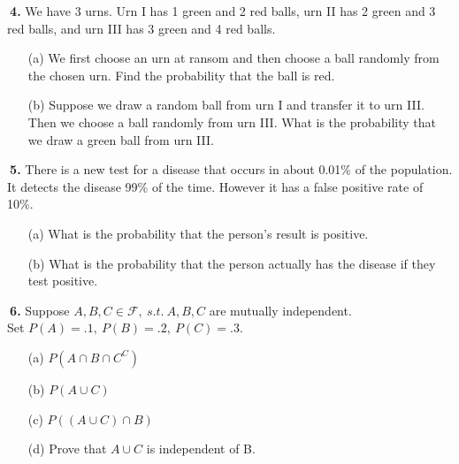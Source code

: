 \documentclass[12pt]{report}
\begin{document}
\noindent {} $~$\textbf{4.} We have 3 urns. Urn I has 1 green and 2 red balls, urn II has 2 green and 3 red balls, and urn III has 3 green and 4 red balls. 
\begin{itemize}
\item [(a)] We first choose an urn at ransom and then choose a ball randomly from the chosen urn. Find the probability that the ball is red. %
\item [(b)] Suppose we draw a random ball from urn I and transfer it to urn III. Then we choose a ball randomly from urn III. What is the probability that we draw a green ball from urn III.
\end{itemize}
\pagebreak





\noindent {} $~$\textbf{5.} There is a new test for a disease that occurs in about 0.01\% of the population. It detects the disease 99\% of the time. However it has a false positive rate of 10\%. 
\begin{itemize}
\item [(a)] What is the probability that the person's result is positive.		%
\item [(b)] What is the probability that the person actually has the disease if they test positive.		%
\end{itemize}
\pagebreak





\noindent {} $~$\textbf{6.} Suppose $A,B,C\in\mathcal{F},~s.t.~A,B,C$ are mutually independent. \\

Set $P(A)=.1,~P(B)=.2,~P(C)=.3$. 
\begin{itemize}
\item [(a)] $P(A\cap B \cap C^C)$ 		%
\item [(b)] $P(A\cup C)$			%
\item [(c)] $P((A\cup C)\cap B)$
\item [(d)] Prove that $A\cup C$ is independent of B.
\end{itemize}
\pagebreak
\end{document}
